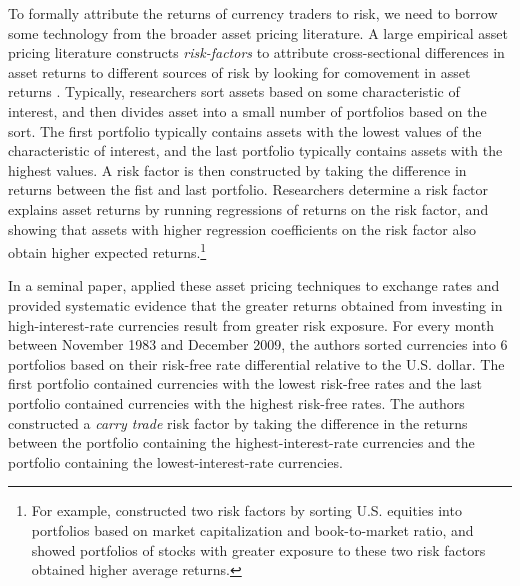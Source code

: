To formally attribute the returns of currency traders to risk, we need
to borrow some technology from the broader asset pricing literature.
A large empirical asset pricing literature constructs
\emph{risk-factors} to attribute cross-sectional differences in asset
returns to different sources of risk by looking for comovement in
asset returns \citep{Fama1976}. Typically, researchers sort assets
based on some characteristic of interest, and then divides asset into
a small number of portfolios based on the sort. The first portfolio
typically contains assets with the lowest values of the characteristic
of interest, and the last portfolio typically contains assets with the
highest values. A risk factor is then constructed by taking the
difference in returns between the fist and last portfolio. Researchers
determine a risk factor explains asset returns by running regressions
of returns on the risk factor, and showing that assets with higher
regression coefficients on the risk factor also obtain higher expected
returns.\footnote{For example, \citet{FamaFrench1992} constructed two
  risk factors by sorting U.S. equities into portfolios based on
  market capitalization and book-to-market ratio, and showed
  portfolios of stocks with greater exposure to these two risk factors
  obtained higher average returns.}


In a seminal paper, \citet{LustigRoussanovVerdelhan2011} applied these
asset pricing techniques to exchange rates and provided systematic
evidence that the greater returns obtained from investing in
high-interest-rate currencies result from greater risk exposure. For
every month between November 1983 and December 2009, the authors
sorted currencies into 6 portfolios based on their risk-free rate
differential relative to the U.S. dollar. The first portfolio
contained currencies with the lowest risk-free rates and the last
portfolio contained currencies with the highest risk-free rates. The
authors constructed a \emph{carry trade} risk factor by taking the
difference in the returns between the portfolio containing the
highest-interest-rate currencies and the portfolio containing the
lowest-interest-rate currencies.

